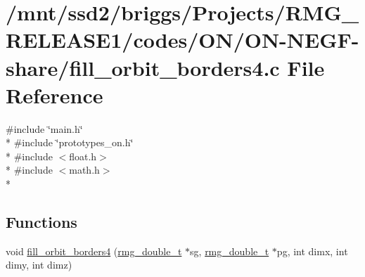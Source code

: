 \hypertarget{_o_n_2_o_n-_n_e_g_f-share_2fill__orbit__borders4_8c}{\section{/mnt/ssd2/briggs/\-Projects/\-R\-M\-G\-\_\-\-R\-E\-L\-E\-A\-S\-E1/codes/\-O\-N/\-O\-N-\/\-N\-E\-G\-F-\/share/fill\-\_\-orbit\-\_\-borders4.c File Reference}
\label{_o_n_2_o_n-_n_e_g_f-share_2fill__orbit__borders4_8c}
}
{\ttfamily \#include \char`\"{}main.\-h\char`\"{}}\\*
{\ttfamily \#include \char`\"{}prototypes\-\_\-on.\-h\char`\"{}}\\*
{\ttfamily \#include $<$float.\-h$>$}\\*
{\ttfamily \#include $<$math.\-h$>$}\\*
\subsection*{Functions}
\begin{DoxyCompactItemize}
\item 
void \hyperlink{_o_n_2_o_n-_n_e_g_f-share_2fill__orbit__borders4_8c_a4d08665f7ebeb54646a89ef4e218cbc9}{fill\-\_\-orbit\-\_\-borders4} (\hyperlink{rmgtypes_8h_aaa16921c14f121c56eaa42390a340db8}{rmg\-\_\-double\-\_\-t} $\ast$sg, \hyperlink{rmgtypes_8h_aaa16921c14f121c56eaa42390a340db8}{rmg\-\_\-double\-\_\-t} $\ast$pg, int dimx, int dimy, int dimz)
\end{DoxyCompactItemize}


